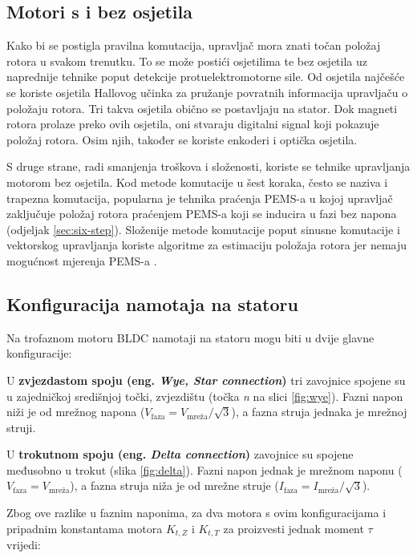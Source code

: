 \documentclass[diplomskirad]{fer}
\begin{document}
\subsection{Motori s i bez osjetila}

Kako bi se postigla pravilna komutacija, upravljač mora znati točan položaj
rotora u svakom trenutku. To se može postići osjetilima te bez osjetila uz
naprednije tehnike poput detekcije protuelektromotorne sile. Od osjetila
najčešće se koriste osjetila Hallovog učinka za pružanje povratnih informacija
upravljaču o položaju rotora. Tri takva osjetila obično se postavljaju na
stator. Dok magneti rotora prolaze preko ovih osjetila, oni stvaraju digitalni
signal koji pokazuje položaj rotora. Osim njih, također se koriste enkoderi i
optička osjetila.

S druge strane, radi smanjenja troškova i složenosti, koriste se tehnike
upravljanja motorom bez osjetila. Kod metode komutacije u šest koraka, često se
naziva i trapezna komutacija, popularna je tehnika praćenja PEMS-a u kojoj
upravljač zaključuje položaj rotora praćenjem PEMS-a koji se inducira u fazi
bez napona (odjeljak \ref{sec:six-step}). Složenije metode komutacije poput
sinusne komutacije i vektorskog upravljanja koriste algoritme za estimaciju
položaja rotora jer nemaju mogućnost mjerenja PEMS-a \cite{NXP_AN2355}.

\subsection{Konfiguracija namotaja na statoru}
\label{sec:konfiguracija_namotaja}
Na trofaznom motoru BLDC namotaji na statoru mogu biti u dvije glavne
konfiguracije:

U \textbf{zvjezdastom spoju (eng. \textit{Wye, Star connection})} tri zavojnice
spojene su u zajedničkoj središnjoj točki, zvjezdištu (točka \textit{n} na
slici \ref{fig:wye}). Fazni napon niži je od mrežnog napona ($V_{\text{faza}} =
	V_{\text{mreža}} / \sqrt{3}$), a fazna struja jednaka je mrežnoj struji.

U \textbf{trokutnom spoju (eng. \textit{Delta connection})} zavojnice su
spojene međusobno u trokut (slika \ref{fig:delta}). Fazni napon jednak je
mrežnom naponu ($V_{\text{faza}} = V_{\text{mreža}}$), a fazna struja niža je
od mrežne struje ($I_{\text{faza}} = I_{\text{mreža}} / \sqrt{3}$).

Zbog ove razlike u faznim naponima, za dva motora s ovim konfiguracijama i
pripadnim konstantama motora $K_{t, Z}$ i $K_{t, T}$ za proizvesti jednak
moment $\tau$ vrijedi: \\
\end{document}
